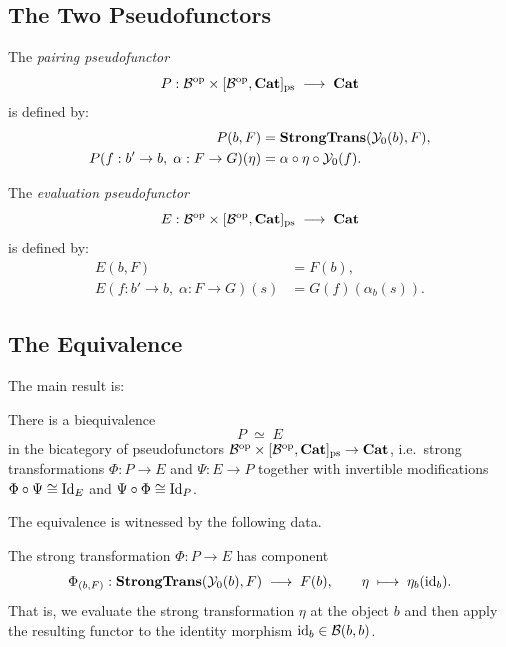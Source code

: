 \documentclass[12pt]{article}
\begin{document}
\subsection{The Two Pseudofunctors}

\begin{definition}\label{def:pairing}
  The \emph{pairing pseudofunctor}
  \[
    P : \mathcal{B}^{\mathrm{op}} \times [\mathcal{B}^{\mathrm{op}}, \mathbf{Cat}]_{\mathrm{ps}} \;\longrightarrow\; \mathbf{Cat}
  \]
  is defined by:
  \begin{align*}
    P(b, F) &= \mathbf{StrongTrans}(\mathcal{Y}_0(b), F), \\
    P(f : b' \to b,\; \alpha : F \to G)(\eta) &= \alpha \circ \eta \circ \mathcal{Y}_0(f).
  \end{align*}
\end{definition}

\begin{definition}\label{def:evaluation}
  The \emph{evaluation pseudofunctor}
  \[
    E : \mathcal{B}^{\mathrm{op}} \times [\mathcal{B}^{\mathrm{op}}, \mathbf{Cat}]_{\mathrm{ps}} \;\longrightarrow\; \mathbf{Cat}
  \]
  is defined by:
  \begin{align*}
    E(b, F) &= F(b), \\
    E(f : b' \to b,\; \alpha : F \to G)(s) &= G(f)(\alpha_b(s)).
  \end{align*}
\end{definition}

\subsection{The Equivalence}

The main result is:

\begin{theorem}\label{thm:yoneda}
  There is a biequivalence
  \[
    P \;\simeq\; E
  \]
  in the bicategory of pseudofunctors
  $\mathcal{B}^{\mathrm{op}} \times [\mathcal{B}^{\mathrm{op}}, \mathbf{Cat}]_{\mathrm{ps}} \to \mathbf{Cat}$,
  i.e.\ strong transformations
  $\Phi : P \to E$ and $\Psi : E \to P$ together with invertible modifications
  $\Phi \circ \Psi \cong \mathrm{Id}_E$ and $\Psi \circ \Phi \cong \mathrm{Id}_P$.
\end{theorem}

The equivalence is witnessed by the following data.

\begin{definition}
  The strong transformation $\Phi : P \to E$ has component
  \[
    \Phi_{(b,F)} : \mathbf{StrongTrans}(\mathcal{Y}_0(b), F) \;\longrightarrow\; F(b), \qquad
    \eta \;\longmapsto\; \eta_b(\mathrm{id}_b).
  \]
  That is, we evaluate the strong transformation $\eta$ at the object $b$ and then
  apply the resulting functor to the identity morphism $\mathrm{id}_b \in \mathcal{B}(b,b)$.
\end{definition}
\end{document}

